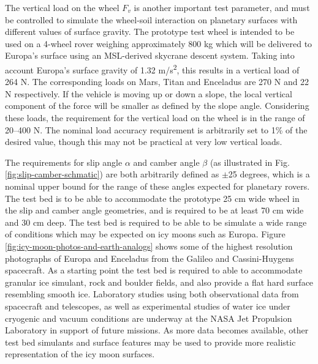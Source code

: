 \documentclass{article}
\begin{document}
The vertical load on the wheel $F_v$ is another important test parameter, and must be controlled to simulate the wheel-soil interaction on planetary surfaces with different values of surface gravity. The prototype test wheel is intended to be used on a 4-wheel rover weighing approximately 800 kg which will be delivered to Europa's surface using an MSL-derived skycrane descent system. Taking into account Europa's surface gravity of 1.32 m/s\textsuperscript{2}, this results in a vertical load of 264 N. The corresponding loads on Mars, Titan and Enceladus are 270 N and 22 N respectively. If the vehicle is moving up or down a slope, the local vertical component of the force will be smaller as defined by the slope angle.  Considering these loads, the requirement for the vertical load on the wheel is in the range of 20--400 N. The nominal  load accuracy requirement is arbitrarily set to 1\% of the desired value, though this may not be practical at very low vertical loads. 

The requirements for slip angle $\alpha$ and camber angle $\beta$ (as illustrated in Fig. \ref{fig:slip-camber-schmatic}) are both arbitrarily defined as $\pm$25 degrees, which is a nominal upper bound for the range of these angles expected for planetary rovers. The test bed is to be able to accommodate the prototype 25 cm wide wheel in the slip and camber angle geometries, and is required to be at least 70 cm wide and 30 cm deep. The test bed is required to be able to be simulate a wide range of conditions which may be expected on icy moons such as Europa. Figure \ref{fig:icy-moon-photos-and-earth-analogs} shows some of the highest resolution photographs of Europa and Enceladus from the Galileo and Cassini-Huygens spacecraft. As a starting point the test bed is required to able to accommodate granular ice simulant, rock and boulder fields, and also provide a flat hard surface resembling smooth ice. Laboratory studies using both observational data from spacecraft and telescopes, as well as experimental studies of water ice under cryogenic and  vacuum conditions are underway at the NASA Jet Propulsion Laboratory in support of future missions. As more data becomes available, other test bed simulants and surface features may be used to provide more realistic representation of the icy moon surfaces. 
\end{document}
